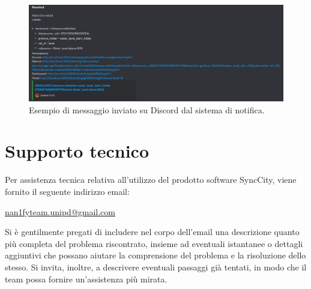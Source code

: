 \documentclass[8pt]{article}
\begin{document}
\begin{figure}[H]
    \centering
    \includegraphics[width=15cm]{images_mu/discord.png}
    \caption{Esempio di messaggio inviato su Discord dal sistema di notifica.}
    \label{fig:Esempio di messaggio inviato su Discord dal sistema di notifica}
\end{figure}
\section{Supporto tecnico} \label{sec:support}
Per assistenza tecnica relativa all’utilizzo del prodotto software SyncCity, viene fornito il
seguente indirizzo email:
\begin{center}
    \parbox{\linewidth}{\centering
        \href{mailto: nan1fyteam.unipd@gmail.com}{nan1fyteam.unipd@gmail.com}
    }
\end{center}
Si è gentilmente pregati di includere nel corpo dell’email una descrizione quanto più completa del problema riscontrato, 
insieme ad eventuali istantanee o dettagli aggiuntivi che possano aiutare la comprensione del problema e la risoluzione dello stesso.
Si invita, inoltre, a descrivere eventuali passaggi già tentati, in modo che il team possa fornire un’assistenza più mirata.
\end{document}
